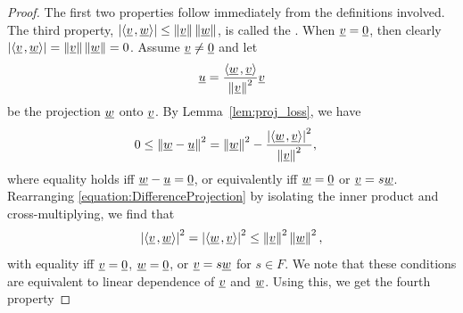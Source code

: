 \begin{proof}
The first two properties follow immediately from the definitions involved.
The third property, $\left| {\left\langle  \underline{v}  \mskip2mu ,  \underline{w}  \right\rangle} \right| \leq \left\| \underline{v} \right\| \left\| \underline{w} \right\|$, is called the .
When $\underline{v} = \underline{0}$, then clearly $\left| {\left\langle  \underline{v}  \mskip2mu ,  \underline{w}  \right\rangle} \right| = \left\| \underline{v} \right\| \left\| \underline{w} \right\| =0$.
Assume $\underline{v} \neq \underline{0}$ and let
\begin{equation*}
\underline{u} = \frac{ {\left\langle  \underline{w}  \mskip2mu ,  \underline{v}  \right\rangle}}{ \left\| \underline{v} \right\|^2 } \underline{v}
\end{equation*}
be the projection $\underline{w}$ onto $\underline{v}$.
By Lemma~\ref{lem:proj_loss},
we have
\begin{align} \label{equation:DifferenceProjection}
0 &\leq \left\| \underline{w} - \underline{u} \right\|^2
= \left\| \underline{w} \right\|^2
- \frac{ \left| {\left\langle  \underline{w}  \mskip2mu ,  \underline{v}  \right\rangle} \right|^2 }
{ \left\| \underline{v} \right\|^2 } ,
\end{align}
where equality holds iff $\underline{w}-\underline{u}=\underline{0}$, or equivalently iff $\underline{w}=\underline{0}$ or $\underline{v} = s \underline{w}$.
Rearranging \eqref{equation:DifferenceProjection} by isolating the inner product and cross-multiplying, we find that
\begin{equation*}
\left| {\left\langle  \underline{v}  \mskip2mu ,  \underline{w}  \right\rangle} \right|^2 = \left| {\left\langle  \underline{w}  \mskip2mu ,  \underline{v}  \right\rangle} \right|^2 \leq \left\| \underline{v} \right\|^2 \left\| \underline{w} \right\|^2,
\end{equation*}
with equality iff $\underline{v}=\underline{0}$, $\underline{w}=\underline{0}$, or $\underline{v} = s \underline{w}$ for $s\in F$.
We note that these conditions are equivalent to linear dependence of $\underline{v}$ and $\underline{w}$.
Using this, we get the fourth property

\end{proof}
